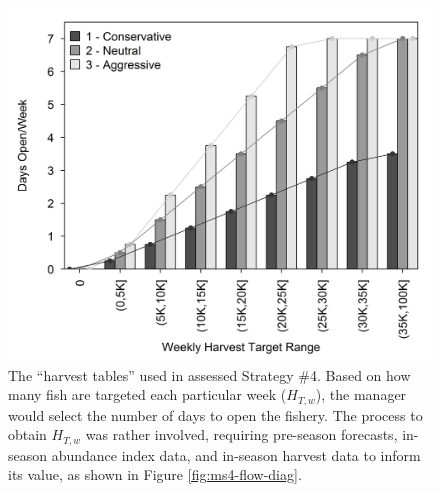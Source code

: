 \documentclass[12pt,]{book}
\theoremstyle{definition}
\theoremstyle{definition}
\theoremstyle{definition}
\theoremstyle{remark}
\begin{document}
\begin{singlespace}
\clearpage

\begin{figure}
  \centering
  \includegraphics{img/Ch3/MS4_Schedules.jpg}
  \caption{The ``harvest tables'' used in assessed Strategy \#4. Based on how many fish are targeted each particular week ($H_{T,w}$), the manager would select the number of days to open the fishery. The process to obtain $H_{T,w}$ was rather involved, requiring pre-season forecasts, in-season abundance index data, and in-season harvest data to inform its value, as shown in Figure \ref{fig:ms4-flow-diag}.}
  \label{fig:ms4-schedules}
\end{figure}

\clearpage


\end{singlespace}
\end{document}
